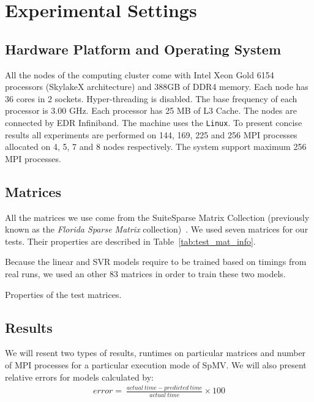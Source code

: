\documentclass[sigconf,review,anonymous]{acmart}
\begin{document}
\section{Experimental Settings}
\subsection{Hardware Platform and Operating System}
All the nodes of the computing cluster come with Intel Xeon Gold
6154 processors (SkylakeX architecture) and 388GB of DDR4
memory. Each node has 36 cores in 2 sockets. Hyper-threading is
disabled. The base frequency of each processor is 3.00 GHz.  Each
processor has 25 MB of L3 Cache. The nodes are connected by EDR
Infiniband. The machine uses the \texttt{Linux}. To present
concise results all experiments are performed on 144, 169, 225 and 256 MPI processes
allocated on 4, 5, 7 and 8 nodes respectively. The system support maximum 256 MPI processes.

\subsection{Matrices}

All the matrices we use come from the SuiteSparse Matrix Collection
(previously known as the \textit{Florida Sparse Matrix}
collection)~\cite{Davis11}. We used seven matrices for our
tests. Their properties are described in Table~\ref{tab:test_mat_info}.

Because the linear and SVR models require to be trained based on
timings from real runs, we used an other 83 matrices in order to train
these two models.

\begin{table}[htb]
\caption{Properties of the test matrices.}
\label{tab:test_mat_info}
\let\center\empty
\let\endcenter\relax
\centering
\resizebox{.8\width}{!}{}
\end{table}

\subsection{Results}

We will resent two types of results, runtimes on particular matrices
and number of MPI processes for a particular execution mode of
SpMV. We will also present relative errors for models calculated by:
\begin{eqnarray*}
error =\ \frac{actual\ time - predicted\ time}{actual\ time}\times 100
\end{eqnarray*}
\end{document}
